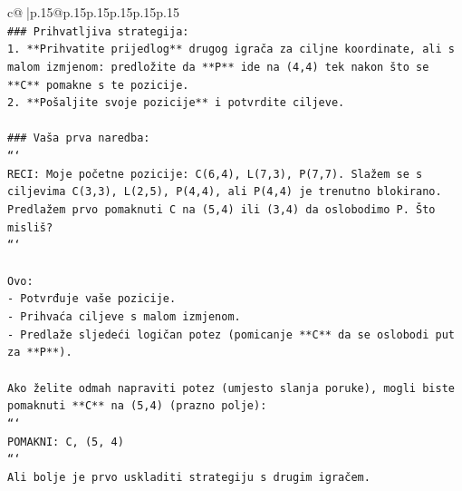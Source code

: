 \documentclass{article}
\begin{document}
{\begin{supertabular}{c@{$\;$}|p{.15\linewidth}@{}p{.15\linewidth}p{.15\linewidth}p{.15\linewidth}p{.15\linewidth}p{.15\linewidth}}
{{{\\ 
\texttt{\#\#\# Prihvatljiva strategija:} \\
\texttt{1. **Prihvatite prijedlog** drugog igrača za ciljne koordinate, ali s malom izmjenom: predložite da **P** ide na (4,4) tek nakon što se **C** pomakne s te pozicije.} \\
\texttt{2. **Pošaljite svoje pozicije** i potvrdite ciljeve.} \\
\\ 
\texttt{\#\#\# Vaša prva naredba:} \\
\texttt{```} \\
\texttt{RECI: Moje početne pozicije: C(6,4), L(7,3), P(7,7). Slažem se s ciljevima C(3,3), L(2,5), P(4,4), ali P(4,4) je trenutno blokirano. Predlažem prvo pomaknuti C na (5,4) ili (3,4) da oslobodimo P. Što misliš?} \\
\texttt{```} \\
\\ 
\texttt{Ovo:} \\
\texttt{{-} Potvrđuje vaše pozicije.} \\
\texttt{{-} Prihvaća ciljeve s malom izmjenom.} \\
\texttt{{-} Predlaže sljedeći logičan potez (pomicanje **C** da se oslobodi put za **P**).} \\
\\ 
\texttt{Ako želite odmah napraviti potez (umjesto slanja poruke), mogli biste pomaknuti **C** na (5,4) (prazno polje):} \\
\texttt{```} \\
\texttt{POMAKNI: C, (5, 4)} \\
\texttt{```} \\
\texttt{Ali bolje je prvo uskladiti strategiju s drugim igračem.} \\
            }
        }
    }
     \\ \\


\end{supertabular}}
\end{document}

